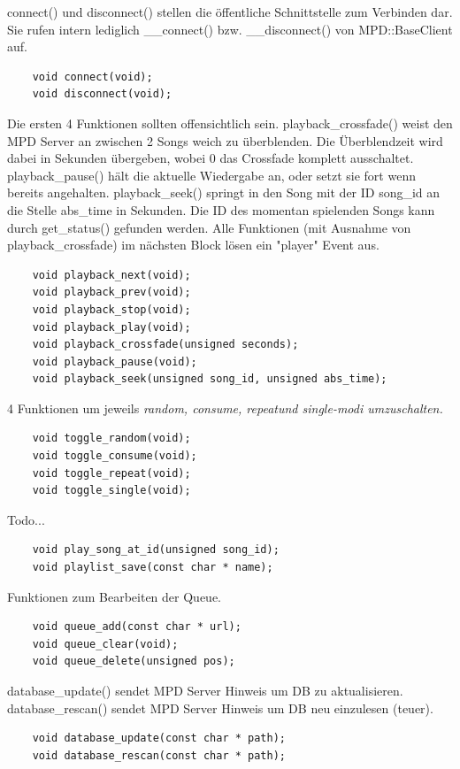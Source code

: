 connect() und disconnect() stellen die öffentliche Schnittstelle zum Verbinden dar.
Sie rufen intern lediglich \_\_connect() bzw. \_\_disconnect() von MPD::BaseClient auf.
\begin{verbatim}
    void connect(void);
    void disconnect(void);
\end{verbatim}

Die ersten 4 Funktionen sollten offensichtlich sein.
playback\_crossfade() weist den MPD Server an zwischen 2 Songs weich zu überblenden. Die Überblendzeit wird
dabei in Sekunden übergeben, wobei 0 das Crossfade komplett ausschaltet.
playback\_pause() hält die aktuelle Wiedergabe an, oder setzt sie fort wenn bereits angehalten.
playback\_seek() springt in den Song mit der ID song\_id an die Stelle abs\_time in Sekunden.
Die ID des momentan spielenden Songs kann durch get\_status() gefunden werden.
Alle Funktionen (mit Ausnahme von playback\_crossfade) im nächsten Block lösen ein "player" Event aus.
\begin{verbatim}
    void playback_next(void);
    void playback_prev(void);
    void playback_stop(void);
    void playback_play(void);
    void playback_crossfade(unsigned seconds);    
    void playback_pause(void);
    void playback_seek(unsigned song_id, unsigned abs_time);
\end{verbatim}

4 Funktionen um jeweils \it random, consume, repeat\rm und \textit{single}-modi umzuschalten.
\begin{verbatim}
    void toggle_random(void);
    void toggle_consume(void);
    void toggle_repeat(void);
    void toggle_single(void);
\end{verbatim}

Todo...
\begin{verbatim}
    void play_song_at_id(unsigned song_id);
    void playlist_save(const char * name);
\end{verbatim}   

Funktionen zum Bearbeiten der Queue. 
\begin{verbatim}
    void queue_add(const char * url);
    void queue_clear(void);
    void queue_delete(unsigned pos);
\end{verbatim}

database\_update() sendet MPD Server Hinweis um DB zu aktualisieren.
database\_rescan() sendet MPD Server Hinweis um DB neu einzulesen (teuer).
\begin{verbatim}
    void database_update(const char * path);
    void database_rescan(const char * path);
\end{verbatim}

